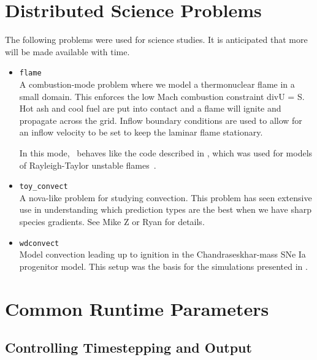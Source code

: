 \section{Distributed Science Problems}

The following problems were used for science studies.  It is
anticipated that more will be made available with time.

\begin{itemize}

\item {\tt flame} \\[-3mm]

   A combustion-mode problem where we model a thermonuclear flame in a
   small domain.  This enforces the low Mach combustion constraint
   div{U} = S.  Hot ash and cool fuel are put into contact and a flame
   will ignite and propagate across the grid.  Inflow boundary
   conditions are used to allow for an inflow velocity to be set to
   keep the laminar flame stationary.

   In this mode, \maestro\ behaves like the code described
   in \cite{SNe}, which was used for models of Rayleigh-Taylor
   unstable flames~\cite{SNld,SNrt,SNrt3d}.

\item {\tt toy\_convect} \\[-3mm]

A nova-like problem for studying convection.  This problem has seen
extensive use in understanding which prediction types are the best
when we have sharp species gradients.  See Mike Z or Ryan for details.

\item {\tt wdconvect} \\[-3mm]

Model convection leading up to ignition in the Chandraseskhar-mass SNe
Ia progenitor model.  This setup was the basis for the simulations
presented in \cite{lowMach4,wdconvect,wdturb}.


\end{itemize}


\section{Common Runtime Parameters}
\label{sec:gettingstarted:runtime}

\subsection{Controlling Timestepping and Output}


